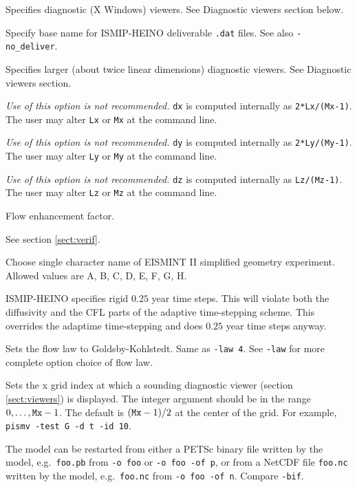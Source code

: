 \documentclass[11pt,final]{amsart}
\renewcommand{\t}[1]{\texttt{#1}}
\begin{document}
  Specifies diagnostic (X Windows) viewers.  See Diagnostic viewers section below.

  Specify base name for ISMIP-HEINO deliverable \verb|.dat| files.  See also \verb|-no_deliver|.

  Specifies larger (about twice linear dimensions) diagnostic viewers.  See Diagnostic viewers section.

  \emph{Use of this option is not recommended.}  \verb|dx| is computed internally as \verb|2*Lx/(Mx-1)|.  The user may alter \verb|Lx| or \verb|Mx| at the command line.

  \emph{Use of this option is not recommended.}  \verb|dy| is computed internally as \verb|2*Ly/(My-1)|.  The user may alter \verb|Ly| or \verb|My| at the command line.

  \emph{Use of this option is not recommended.}  \verb|dz| is computed internally as \verb|Lz/(Mz-1)|.  The user may alter \verb|Lz| or \verb|Mz| at the command line.

  Flow enhancement factor.

  See section \ref{sect:verif}.

  Choose single character name of EISMINT II \cite{EISMINT00} simplified geometry experiment.  Allowed values are A, B, C, D, E, F, G, H.

  ISMIP-HEINO specifies rigid $0.25$ year time steps.  This will violate both the diffusivity and the CFL parts of the adaptive time-stepping scheme.  This overrides the adaptime time-stepping and does $0.25$ year time steps anyway.

  Sets the flow law to Goldsby-Kohlstedt.  Same as \verb|-law 4|.  See \verb|-law| for more complete option choice of flow law.

  Sets the x grid index at which a sounding diagnostic viewer (section \ref{sect:viewers}) is displayed.  The integer argument should be in the range $0,\dots,\text{\t{Mx}}-1$.  The default is $(\text{\t{Mx}}-1)/2$ at the center of the grid.  For example, \verb|pismv -test G -d t -id 10|.

  The model can be restarted from either a PETSc binary file written by the model, e.g.~\verb|foo.pb| from \verb|-o foo| or \verb|-o foo -of p|, or from a NetCDF file \verb|foo.nc| written by the model, e.g.~\verb|foo.nc| from \verb|-o foo -of n|.  Compare \verb|-bif|.
\end{document}
